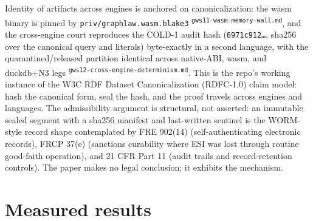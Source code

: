 \documentclass[11pt,a4paper]{article}
\newcommand{\art}[1]{\textsuperscript{\tiny\texttt{#1}}}
\begin{document}
Identity of artifacts across engines is anchored on canonicalization: the wasm binary is
pinned by \texttt{priv/graphlaw.wasm.blake3} \art{gws11-wasm-memory-wall.md}, and the
cross-engine court reproduces the COLD-1 audit hash
(\texttt{6971c912\ldots}, sha256 over the canonical query and literals) byte-exactly in a
second language, with the quarantined/released partition identical across native-ABI, wasm,
and duckdb+N3 legs \art{gws12-cross-engine-determinism.md}. This is the repo's working
instance of the W3C RDF Dataset Canonicalization (RDFC-1.0) claim model: hash the canonical
form, seal the hash, and the proof travels across engines and languages. The admissibility
argument is structural, not asserted: an immutable sealed segment with a sha256 manifest and
last-written sentinel is the WORM-style record shape contemplated by FRE 902(14)
(self-authenticating electronic records), FRCP 37(e) (sanctions curability where ESI was
lost through routine good-faith operation), and 21 CFR Part 11 (audit trails and
record-retention controls). The paper makes no legal conclusion; it exhibits the mechanism.

\section{Measured results}
\end{document}
